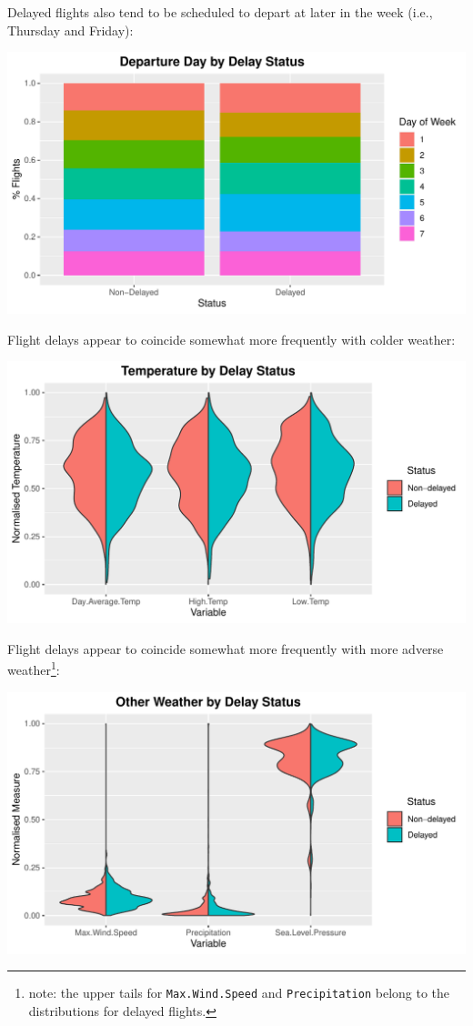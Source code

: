 \documentclass[
]{article}
\begin{document}
Delayed flights also tend to be scheduled to depart at later in the week
(i.e., Thursday and Friday):

\begin{center}\includegraphics{Visualisation_Analysis_files/figure-latex/features_plt_9-1} \end{center}

Flight delays appear to coincide somewhat more frequently with colder
weather:

\begin{center}\includegraphics{Visualisation_Analysis_files/figure-latex/features_plt_10-1} \end{center}
\newpage

Flight delays appear to coincide somewhat more frequently with more
adverse
weather\footnote{note: the upper tails for \texttt{Max.Wind.Speed} and \texttt{Precipitation} belong to the distributions for delayed flights.}:

\begin{center}\includegraphics{Visualisation_Analysis_files/figure-latex/features_plt_11-1} \end{center}
\end{document}
